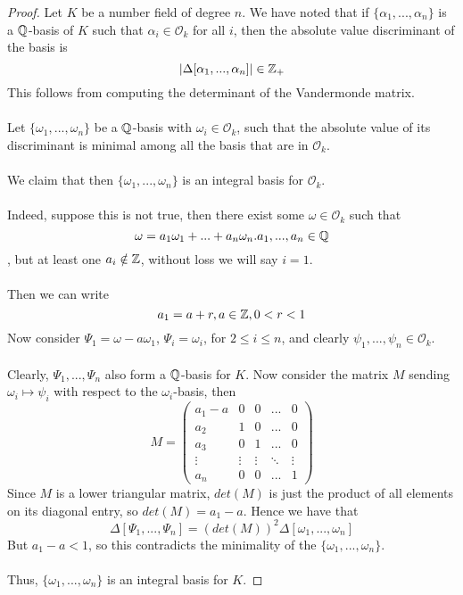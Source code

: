 \begin{proof}
Let $K$ be a number field of degree $n$. We have noted that if $\{\alpha_1, ..., \alpha_n\}$ is a $\mathbb{Q}$-basis of $K$ such that $\alpha_i \in \mathcal{O}_k$ for all $i$, then the absolute value discriminant of the basis is
\[|\Delta[\alpha_1, ..., \alpha_n]| \in \mathbb{Z}_+\]
This follows from computing the determinant of the Vandermonde matrix.\\\\
Let $\{\omega_1, ..., \omega_n\}$ be a $\mathbb{Q}$-basis with $\omega_i \in \mathcal{O}_k$, such that the absolute value of its discriminant is minimal among all the basis that are in $\mathcal{O}_k$.\\\\
We claim that then $\{\omega_1, ..., \omega_n\}$ is an integral basis for $\mathcal{O}_k$.\\\\
Indeed, suppose this is not true, then there exist some $\omega \in \mathcal{O}_k$ such that
\[\omega = a_1 \omega_1 + ... + a_n \omega_n. a_1, ..., a_n \in \mathbb{Q}\]
, but at least one $a_i \notin \mathbb{Z}$, without loss we will say $i = 1$.\\\\
Then we can write
\[a_1 = a + r, a \in \mathbb{Z}, 0 < r < 1\]
Now consider $\Psi_1 = \omega - a \omega_1$, $\Psi_i = \omega_i$, for $2 \leq i \leq n$, and clearly $\psi_1, ..., \psi_n \in \mathcal{O}_k$.\\\\
Clearly, $\Psi_1, ..., \Psi_n$ also form a $\mathbb{Q}$-basis for $K$. Now consider the matrix $M$ sending $\omega_i \mapsto \psi_i$ with respect to the $\omega_i$-basis, then
\[M = \begin{pmatrix}
a_1 - a & 0 & 0 & ... & 0\\
a_2 & 1 & 0 & ... & 0\\
a_3 & 0 & 1 & ... & 0\\
\vdots & \vdots & \vdots & \ddots & \vdots\\
a_n & 0 & 0 & ... & 1
\end{pmatrix}\]
Since $M$ is a lower triangular matrix, $det(M)$ is just the product of all elements on its diagonal entry, so $det(M) = a_1 - a$. Hence we have that
\[\Delta[\Psi_1, ..., \Psi_n] = (det(M))^2 \Delta[\omega_1, ..., \omega_n]\]
But $a_1 - a < 1$, so this contradicts the minimality of the $\{\omega_1, ..., \omega_n\}$.\\\\
Thus, $\{\omega_1, ..., \omega_n\}$ is an integral basis for $K$.
\end{proof}

